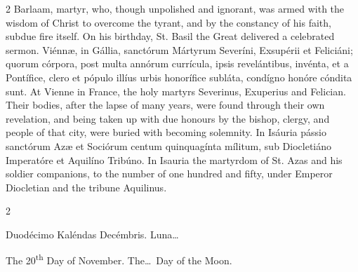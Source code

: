 \begin{paracol}{2}
 Barlaam, martyr, who, though unpolished and ignorant, was armed with the 
 wisdom of Christ to overcome the tyrant, and by the constancy of his faith, 
 subdue fire itself. On his birthday, St. Basil the Great delivered a 
 celebrated sermon.
\switchcolumn*
{}
Viénnæ, in Gállia, 
 sanctórum Mártyrum Severíni, Exsupérii et Feliciáni; quorum córpora, post multa annórum currícula, ipsis revelántibus, invénta, et a Pontífice, clero 
 et pópulo illíus urbis honorífice subláta, condígno honóre cóndita sunt.
\switchcolumn
{}
At Vienne in France, the holy 
 martyrs Severinus, Exuperius and Felician. Their bodies, after the 
 lapse of many years, were found through their own revelation, and being 
 taken up with due honours by the bishop, clergy, and people of that city, 
 were buried with becoming solemnity.
\switchcolumn*
{}
In Isáuria pássio 
 sanctórum Azæ et Sociórum centum quinquagínta mílitum, sub Diocletiáno 
 Imperatóre et Aquilíno Tribúno.
\switchcolumn
{}
In Isauria the martyrdom of St. Azas 
 and his soldier companions, to the number of one hundred and fifty, under 
 Emperor Diocletian and the tribune Aquilinus.
\switchcolumn*
{}
\end{paracol}


\begin{paracol}{2}
\begin{center}{\color{gregoriocolor} Duodécimo Kaléndas Decémbris. 
 Luna\dots\ }\end{center}
\switchcolumn
{}
\begin{center}{\color{gregoriocolor} The 
 20\textsuperscript{th} Day of 
 November. The\dots\ Day of the Moon.}\end{center}
\end{paracol}

